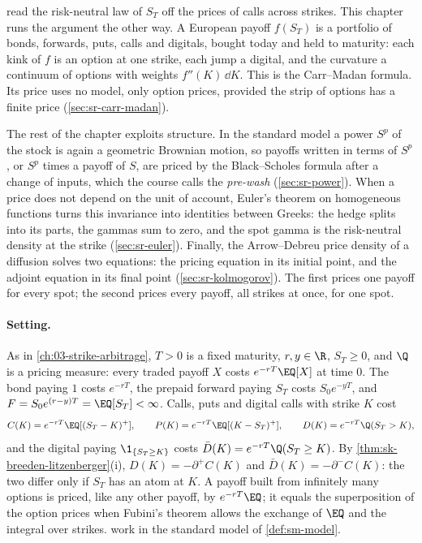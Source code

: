 
 read the risk-neutral law of $S_T$ off the prices of calls across
strikes. This chapter runs the argument the other way. A European payoff $f(S_T)$ is a portfolio of
bonds, forwards, puts, calls and digitals, bought today and held to maturity: each kink of $f$ is an
option at one strike, each jump a digital, and the curvature a continuum of options with weights
$f''(K)\,\dd K$. This is the Carr--Madan formula. Its price uses no model, only option prices, provided
the strip of options has a finite price (\cref{sec:sr-carr-madan}).

The rest of the chapter exploits structure. In the standard model a power $S^p$ of the stock is again
a geometric Brownian motion, so payoffs written in terms of $S^p$, or $S^p$ times a payoff of $S$, are
priced by the Black--Scholes formula after a change of inputs, which the course calls the
\emph{pre-wash} (\cref{sec:sr-power}). When a price does not depend on the unit of account, Euler's
theorem on homogeneous functions turns this invariance into identities between Greeks: the hedge
splits into its parts, the gammas sum to zero, and the spot gamma is the risk-neutral density at the
strike (\cref{sec:sr-euler}). Finally, the Arrow--Debreu price density of a diffusion solves two
equations: the pricing equation in its initial point, and the adjoint equation in its final point
(\cref{sec:sr-kolmogorov}). The first prices one payoff for every spot; the second prices every payoff,
all strikes at once, for one spot.

\paragraph{Setting.} As in \cref{ch:03-strike-arbitrage}, $T>0$ is a fixed maturity, $r,y\in\R$, $S_T\ge0$, and
$\Q$ is a pricing measure: every traded payoff $X$ costs $e^{-rT}\EQ[X]$ at time $0$. The bond paying $1$
costs $e^{-rT}$, the prepaid forward paying $S_T$ costs $S_0e^{-yT}$, and $F=S_0e^{(r-y)T}=\EQ[S_T]<\infty$.
Calls, puts and digital calls with strike $K$ cost
\[
  C(K)=e^{-rT}\EQ[(S_T-K)^+],\qquad P(K)=e^{-rT}\EQ[(K-S_T)^+],\qquad D(K)=e^{-rT}\Q(S_T>K),
\]
and the digital paying $\1_{\{S_T\ge K\}}$ costs $\bar D(K)=e^{-rT}\Q(S_T\ge K)$. By
\cref{thm:sk-breeden-litzenberger}(i), $D(K)=-\partial^+C(K)$ and $\bar D(K)=-\partial^-C(K)$: the two differ
only if $S_T$ has an atom at $K$. A payoff built from infinitely many options is priced, like any other
payoff, by $e^{-rT}\EQ$; it equals the superposition of the option prices when Fubini's theorem allows
the exchange of $\EQ$ and the integral over strikes.  work in the standard
model of \cref{def:sm-model}.

